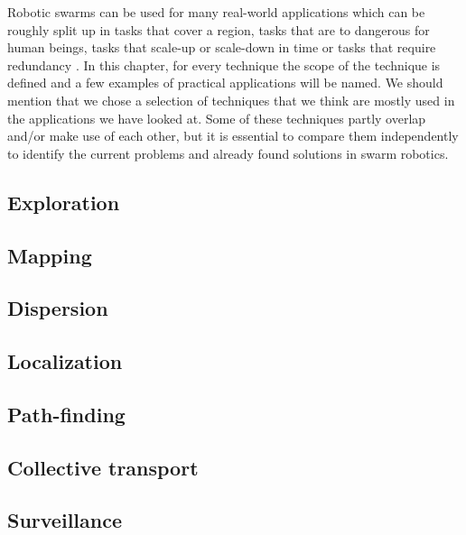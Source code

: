 Robotic swarms can be used for many real-world applications which can be roughly split up in tasks that cover a region, tasks that are to dangerous for human beings, tasks that scale-up or scale-down in time or tasks that require redundancy \cite{csahin2005swarm}. In this chapter, for every technique the scope of the technique is defined and a few examples of practical applications will be named. We should mention that we chose a selection of techniques that we think are mostly used in the applications we have looked at. Some of these techniques partly overlap and/or make use of each other, but it is essential to compare them independently to identify the current problems and already found solutions in swarm robotics.

  \subsection{Exploration}
  
  
  \subsection{Mapping}
  
  
  \subsection{Dispersion}
 

  \subsection{Localization}
 

 \subsection{Path-finding}
 

\subsection{Collective transport}


\subsection{Surveillance}

